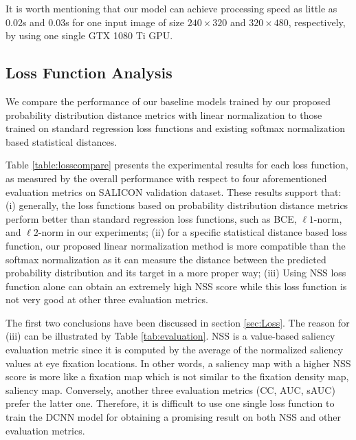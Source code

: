 It is worth mentioning that our model can achieve processing speed as little as 0.02s and 0.03s for one input image of size $240 \times 320$ and $320 \times 480$, respectively, by using one single GTX 1080 Ti GPU. 

\subsection{Loss Function Analysis} 
\label{lossfa}
We compare the performance of our baseline models trained by our proposed probability distribution distance metrics with linear normalization to those trained on standard regression loss functions and existing softmax normalization based statistical distances. 

Table \ref{table:losscompare} presents the experimental results for each loss function, as measured by the overall performance with respect to four aforementioned evaluation metrics on SALICON validation dataset. These results support that: (i) generally, the loss functions based on probability distribution distance metrics perform better than standard regression loss functions, such as BCE, $\ell1$-norm, and $\ell2$-norm in our experiments; (ii) for a specific statistical distance based loss function, our proposed linear normalization method is more compatible than the softmax normalization as it can measure the distance between the predicted probability distribution and its target in a more proper way; (iii) Using NSS loss function alone can obtain an extremely high NSS score while this loss function is not very good at other three evaluation metrics. 

The first two conclusions have been discussed in section \ref{sec:Loss}. The reason for (iii) can be illustrated by Table \ref{tab:evaluation}. NSS is a value-based saliency evaluation metric since it is computed by the average of the normalized saliency values at eye fixation locations. In other words, a saliency map with a higher NSS score is more like a fixation map which is not similar to the fixation density map, \ie saliency map. Conversely, another three evaluation metrics (CC, AUC, sAUC) prefer the latter one. Therefore, it is difficult to use one single loss function to train the DCNN model for obtaining a promising result on both NSS and other evaluation metrics. 





